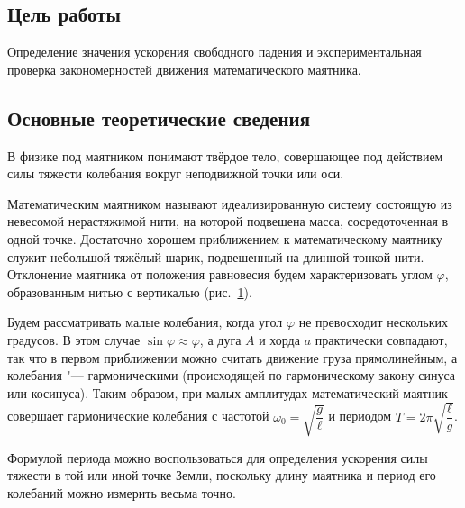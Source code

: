 \documentclass[a4paper, 12pt]{extarticle}
\begin{document}
\MTDTitlePage
\MTDInfoPage

\setcounter{section}{11}

\subsection{Цель работы}
Определение значения ускорения свободного падения и экспериментальная проверка закономерностей движения математического маятника. 

\subsection{Основные теоретические сведения}
В физике под маятником понимают твёрдое тело, совершающее под действием силы тяжести колебания вокруг неподвижной точки или оси. 

Математическим маятником называют идеализированную систему состоящую из невесомой нерастяжимой нити, на которой подвешена масса, сосредоточенная в одной точке. Достаточно хорошем приближением к математическому маятнику служит небольшой тяжёлый шарик, подвешенный на длинной тонкой нити. Отклонение маятника от положения равновесия будем характеризовать углом $\varphi$, образованным нитью с вертикалью (рис.~\ref{fig:m11-pendulum}).

\begin{figure}[h]
\begin{center}
\end{center}
\caption{\label{fig:m11-pendulum}}
\end{figure}

Будем рассматривать малые колебания, когда угол $\varphi$ не превосходит нескольких градусов. В этом случае $\sin \varphi \approx \varphi$, а дуга $A$ и хорда $a$ практически совпадают, так что в первом приближении можно считать движение груза прямолинейным, а колебания "--- гармоническими (происходящей по гармоническому закону синуса или косинуса). Таким образом, при малых амплитудах математический маятник совершает гармонические колебания с частотой $\omega_0 = \sqrt{\dfrac{g}{\ell}}$ и периодом $T = 2 \pi \sqrt{\dfrac{\ell}{g}}$. %

Формулой периода можно воспользоваться для определения ускорения силы тяжести в той или иной точке Земли, поскольку длину маятника и период его колебаний можно измерить весьма точно. 
\end{document}
